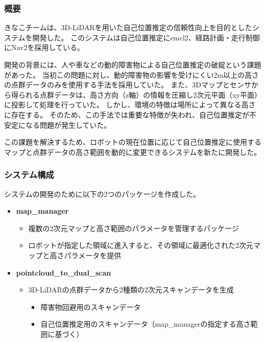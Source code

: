 \subsubsection{概要}
きなこチームは、3D-LiDARを用いた自己位置推定の信頼性向上を目的としたシステムを開発した。
このシステムは自己位置推定にemcl2、経路計画・走行制御にNav2を採用している。

開発の背景には、人や車などの動的障害物による自己位置推定の破綻という課題があった。
当初この問題に対し、動的障害物の影響を受けにくい2m以上の高さの点群データのみを使用する手法を採用していた。
また、3Dマップとセンサから得られる点群データは、高さ方向（z軸）の情報を圧縮し2次元平面（xy平面）に投影して処理を行っていた。
しかし、環境の特徴は場所によって異なる高さに存在する。
そのため、この手法では重要な特徴が失われ、自己位置推定が不安定になる問題が発生していた。

この課題を解決するため、ロボットの現在位置に応じて自己位置推定に使用するマップと点群データの高さ範囲を動的に変更できるシステムを新たに開発した。

\subsubsection{システム構成}
システムの開発のために以下の2つのパッケージを作成した。

\begin{itemize}
  \item \textbf{map\_manager}
    \begin{itemize}
      \item 複数の2次元マップと高さ範囲のパラメータを管理するパッケージ
      \item ロボットが指定した領域に進入すると、その領域に最適化された2次元マップと高さパラメータを提供
    \end{itemize}
  \item \textbf{pointcloud\_to\_dual\_scan}
    \begin{itemize}
      \item 3D-LiDARの点群データから2種類の2次元スキャンデータを生成
        \begin{itemize}
          \item 障害物回避用のスキャンデータ
          \item 自己位置推定用のスキャンデータ（map\_managerの指定する高さ範囲に基づく）
        \end{itemize}
    \end{itemize}
\end{itemize}

